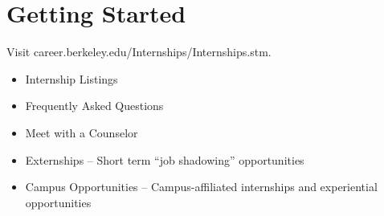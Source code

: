\section*{Getting Started}

Visit {\selectfont career.berkeley.edu/Internships/Internships.stm}.
\begin{itemize}
  \item Internship Listings
  \item Frequently Asked Questions
  \item Meet with a Counselor
  \item Externships – Short term “job shadowing” opportunities
  \item Campus Opportunities – Campus-affiliated internships and experiential opportunities
\end{itemize}

